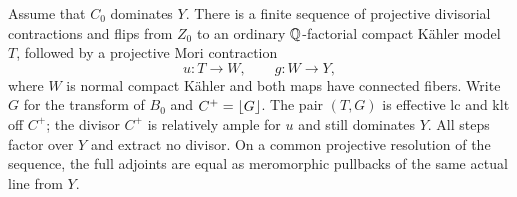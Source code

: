 \begin{lemma}\label{lem:horizontal-mori-model}
Assume that \(C_0\) dominates \(Y\).  There is a finite sequence of
projective divisorial contractions and flips from \(Z_0\) to an ordinary
\(\mathbb Q\)-factorial compact K\"ahler model \(T\), followed by a projective
Mori contraction
\[
 u:T\longrightarrow W,\qquad g:W\longrightarrow Y,
\]
where \(W\) is normal compact K\"ahler and both maps have connected
fibers.  Write \(G\) for the transform of \(B_0\) and
\(C^+=\left\lfloor G\right\rfloor\).  The pair \((T,G)\) is effective lc and klt off
\(C^+\); the divisor \(C^+\) is relatively ample for \(u\) and still
dominates \(Y\).  All steps factor over \(Y\) and extract no divisor.
On a common projective resolution of the sequence, the full adjoints
are equal as meromorphic pullbacks of the same actual line from \(Y\).
\end{lemma}
